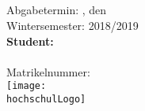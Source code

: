 \begin{titlepage}

\begin{center}

\Large{\studiengang}\\
\LARGE{\betreff}\\[4ex]

\huge{\textbf{\titel}}\\[1.5ex]
\Large{\textbf{\untertitel}}\\[4ex]

\normalsize
Abgabetermin: \abgabeOrt, den \abgabeTermin \\
Wintersemester: 2018/2019 
\\[3em]

\textbf{Student:}\\
\autorName\\
Matrikelnummer: \autorMatrikelnummer\\[5ex]


\texttt{[image: \\hochschulLogo]}\\[2ex]
\betriebName\\
\pruefer\\
\betriebAnschrift\\
\betriebOrt\\[5em]

\end{center}


\end{titlepage}